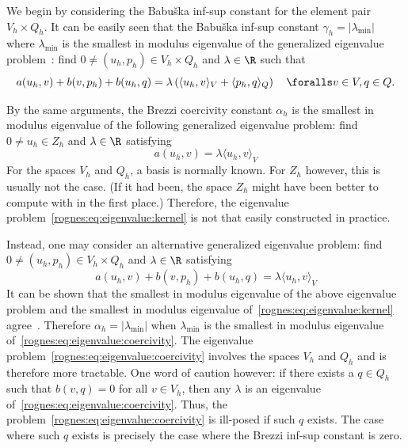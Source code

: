 We begin by considering the Babu\v ska inf-sup constant for the
element pair $V_h \times Q_h$. It can be easily seen that the Babu\v
ska inf-sup constant $\gamma_h = |\lambda_{\min}|$ where
$\lambda_{\min}$ is the smallest in modulus eigenvalue of the
generalized eigenvalue problem~\citep{ArnoldRognes2009, Malkus1981}:
find $0 \not = (u_h, p_h) \in V_h \times Q_h$ and $\lambda \in \R$
such that
\begin{equation}
  \label{rognes:eq:eigenvalue:babuska}
  a(u_h, v) + b(v, p_h) + b(u_h, q)
  = \lambda
  \left (\langle u_h, v \rangle_{V} + \langle p_h, q \rangle_{Q} \right )
  \quad \foralls v \in V, q \in Q.
\end{equation}

By the same arguments, the Brezzi coercivity constant $\alpha_h$ is
the smallest in modulus eigenvalue of the following generalized
eigenvalue problem: find $0 \not = u_h \in Z_h$ and $\lambda \in \R$
satisfying
\begin{equation}
  \label{rognes:eq:eigenvalue:kernel}
  a(u_h, v) = \lambda \langle u_h, v \rangle_{V}
\end{equation}
For the spaces $V_h$ and $Q_h$, a basis is normally known. For $Z_h$
however, this is usually not the case. (If it had been, the space
$Z_h$ might have been better to compute with in the first place.)
Therefore, the eigenvalue problem~\eqref{rognes:eq:eigenvalue:kernel} is not
that easily constructed in practice.

Instead, one may consider an alternative generalized eigenvalue
problem: find $0 \not = (u_h, p_h) \in V_h \times Q_h$ and $\lambda
\in \R$ satisfying
\begin{equation}
  \label{rognes:eq:eigenvalue:coercivity}
  a(u_h, v) + b(v, p_h) + b(u_h, q) = \lambda \langle u_h, v \rangle_{V}
\end{equation}
It can be shown that the smallest in modulus eigenvalue of the above
eigenvalue problem and the smallest in modulus eigenvalue
of~\eqref{rognes:eq:eigenvalue:kernel}
agree~\citep{ArnoldRognes2009}. Therefore $\alpha_h = |\lambda_{\min}|$
when $\lambda_{\min}$ is the smallest in modulus eigenvalue
of~\eqref{rognes:eq:eigenvalue:coercivity}. The eigenvalue
problem~\eqref{rognes:eq:eigenvalue:coercivity} involves the spaces
$V_h$ and $Q_h$ and is therefore more tractable. One word of caution
however: if there exists a $q \in Q_h$ such that $b(v, q) = 0$ for all
$v \in V_h$, then any $\lambda$ is an eigenvalue
of~\eqref{rognes:eq:eigenvalue:coercivity}. Thus, the
problem~\eqref{rognes:eq:eigenvalue:coercivity} is ill-posed if such
$q$ exists. The case where such $q$ exists is precisely the case where
the Brezzi inf-sup constant is zero.

